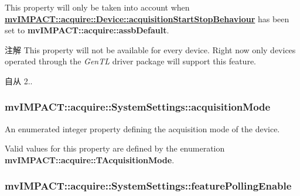 This property will only be taken into account when {\bfseries \hyperlink{classmv_i_m_p_a_c_t_1_1acquire_1_1_device_aa5cdb4615de973bbf1c24f2fd5a3d1b5}{mv\+I\+M\+P\+A\+C\+T\+::acquire\+::\+Device\+::acquisition\+Start\+Stop\+Behaviour}} has been set to {\bfseries mv\+I\+M\+P\+A\+C\+T\+::acquire\+::assb\+Default}.

\begin{DoxyNote}{注解}
This property will not be available for every device. Right now only devices operated through the {\itshape Gen\+T\+L} driver package will support this feature.
\end{DoxyNote}
\begin{DoxySince}{自从}
2.. 
\end{DoxySince}
\hypertarget{classmv_i_m_p_a_c_t_1_1acquire_1_1_system_settings_a8d3f1dbe3ba66311d79fdbe217acd9a9}{
\subsubsection[{acquisition\+Mode}]{ mv\+I\+M\+P\+A\+C\+T\+::acquire\+::\+System\+Settings\+::acquisition\+Mode}}\label{classmv_i_m_p_a_c_t_1_1acquire_1_1_system_settings_a8d3f1dbe3ba66311d79fdbe217acd9a9}


An enumerated integer property defining the acquisition mode of the device. 

Valid values for this property are defined by the enumeration {\bfseries mv\+I\+M\+P\+A\+C\+T\+::acquire\+::\+T\+Acquisition\+Mode}. \hypertarget{classmv_i_m_p_a_c_t_1_1acquire_1_1_system_settings_a527250faf209d3f965146a88ea3a4369}{
\subsubsection[{feature\+Polling\+Enable}]{ mv\+I\+M\+P\+A\+C\+T\+::acquire\+::\+System\+Settings\+::feature\+Polling\+Enable}}\label{classmv_i_m_p_a_c_t_1_1acquire_1_1_system_settings_a527250faf209d3f965146a88ea3a4369}


